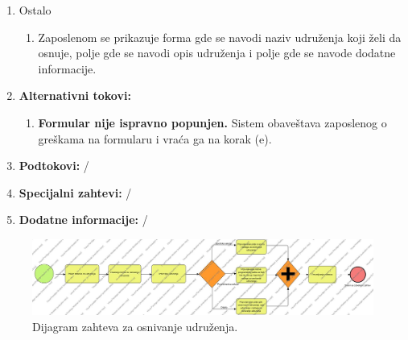 \documentclass[a4paper]{article}
\begin{document}
\begin{enumerate}
\begin{enumerate}
            \end{enumerate}
        \item Ostalo
            \begin{enumerate}
                \item Zaposlenom se prikazuje forma gde se navodi naziv udruženja koji želi da osnuje, polje gde se navodi opis udruženja i polje gde se navode dodatne informacije.
            \end{enumerate}
    \item \textbf{Alternativni tokovi:}
        \begin{enumerate}
            \item \textbf{Formular nije ispravno popunjen.} Sistem obaveštava zaposlenog o greškama na formularu i vraća ga na korak (e).
        \end{enumerate}
    \item \textbf{Podtokovi:} /
    \item \textbf{Specijalni zahtevi:} /
    \item \textbf{Dodatne informacije:} /
\end{enumerate}

\begin{figure} [!ht]
    \begin{center}
        \includegraphics[width=\textwidth,height=\textheight,keepaspectratio]{Korisnici/Udruzenje/BPMN/ZahtevZaOsnivanjeUdruzenja.jpg}
    \end{center}
\caption{Dijagram zahteva za osnivanje udruženja.}
\end{figure}
\end{document}
